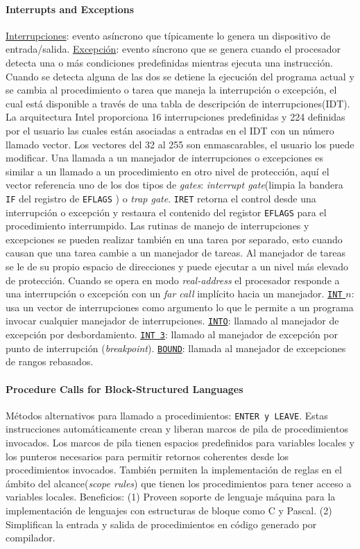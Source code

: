 \paragraph{\textnormal{\textbf{Interrupts and Exceptions}}}
\underline{Interrupciones}: evento asíncrono que típicamente lo genera un dispositivo de entrada/salida. \underline{Excepción}: evento síncrono que se genera cuando el procesador detecta una o más condiciones predefinidas mientras ejecuta una instrucción. Cuando se detecta alguna de las dos se detiene la ejecución del programa actual y se cambia al procedimiento o tarea que maneja la interrupción o excepción, el cual está disponible a través de una tabla de descripción de interrupciones(IDT). La arquitectura Intel proporciona 16 interrupciones predefinidas y 224 definidas por el usuario las cuales están asociadas a entradas en el IDT con un número llamado vector. Los vectores del 32 al 255 son enmascarables, el usuario los puede modificar. Una llamada a un manejador de interrupciones o excepciones es similar a un llamado a un procedimiento en otro nivel de protección, aquí el vector referencia uno de los dos tipos de \textit{gates}: \textit{interrupt gate}(limpia la bandera \texttt{IF} del registro de \texttt{EFLAGS} ) o \textit{trap gate}. \texttt{IRET} retorna el control desde una interrupción o excepción y restaura el contenido del registor \texttt{EFLAGS} para el procedimiento interrumpido. Las rutinas de manejo de interrupciones y excepciones se pueden realizar también en una tarea por separado, esto cuando causan que una tarea cambie a un manejador de tareas. Al manejador de tareas se le de su propio espacio de direcciones y puede ejecutar a un nivel más elevado de protección. Cuando se opera en modo \textit{real-address} el procesador responde a una interrupción o excepción con un \textit{far call} implícito hacia un manejador. \underline{\texttt{INT} $n$}: usa un vector de interrupciones como argumento lo que le permite a un programa invocar cualquier manejador de interrupciones. \underline{\texttt{INTO}}: llamado al manejador de excepción por desbordamiento. \underline{\texttt{INT 3}}: llamado al manejador de excepción por punto de interrupción (\textit{breakpoint}). \underline{\texttt{BOUND}}: llamada al manejador de excepciones de rangos rebasados.

\paragraph{\textnormal{\textbf{Procedure Calls for Block-Structured Languages}}}
Métodos alternativos para llamado a procedimientos: \texttt{ENTER \textnormal{y} LEAVE}. Estas instrucciones automáticamente crean y liberan marcos de pila de procedimientos invocados. Los marcos de pila tienen espacios predefinidos para variables locales y los punteros necesarios para permitir retornos coherentes desde los procedimientos invocados. También permiten la implementación de reglas en el ámbito del alcance(\textit{scope rules}) que tienen los procedimientos para tener acceso a variables locales. Beneficios: (1) Proveen soporte de lenguaje máquina para la implementación de lenguajes con estructuras de bloque como C y Pascal. (2) Simplifican la entrada y salida de procedimientos en código generado por compilador.

